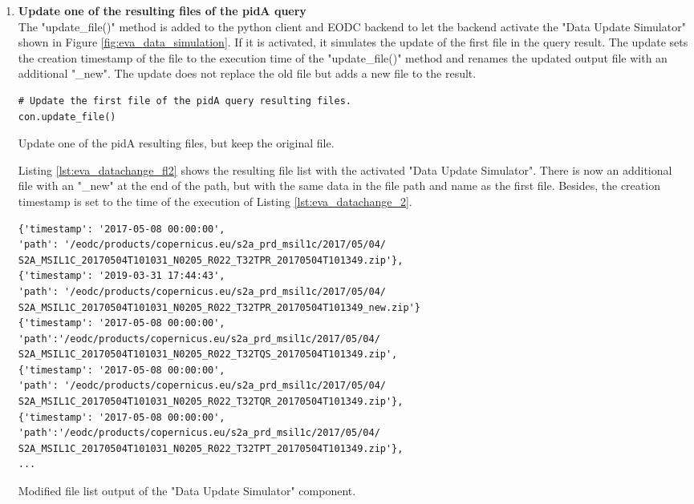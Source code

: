 \documentclass[draft,final]{vutinfth} %
\newenvironment{code}{\captionsetup{type=listing}}{}
\begin{document}
\begin{enumerate}
	\setcounter{enumi}{+1}
	\item \textbf{Update one of the resulting files of the pidA query} \\
	The "update\_file()" method is added to the python client and EODC backend to let the backend activate the "Data Update Simulator" shown in Figure \ref{fig:eva_data_simulation}. If it is activated, it simulates the update of the first file in the query result. The update sets the creation timestamp of the file to the execution time of the "update\_file()" method and renames the updated output file with an additional "\_new". The update does not replace the old file but adds a new file to the result.
	\begin{code}
		\begin{verbatim}
# Update the first file of the pidA query resulting files.
con.update_file()
		\end{verbatim}
		\caption{Update one of the pidA resulting files, but keep the original file.}
		\label{lst:eva_datachange_2}
	\end{code}
	
	Listing \ref{lst:eva_datachange_fl2} shows the resulting file list with the activated "Data Update Simulator". There is now an additional file with an "\_new" at the end of the path, but with the same data in the file path and name as the first file. Besides, the creation timestamp is set to the time of the execution of Listing \ref{lst:eva_datachange_2}.
	
	\begin{code}
		\begin{verbatim}
{'timestamp': '2017-05-08 00:00:00', 
'path': '/eodc/products/copernicus.eu/s2a_prd_msil1c/2017/05/04/
S2A_MSIL1C_20170504T101031_N0205_R022_T32TPR_20170504T101349.zip'}, 
{'timestamp': '2019-03-31 17:44:43', 
'path': '/eodc/products/copernicus.eu/s2a_prd_msil1c/2017/05/04/
S2A_MSIL1C_20170504T101031_N0205_R022_T32TPR_20170504T101349_new.zip'}
{'timestamp': '2017-05-08 00:00:00',
'path':'/eodc/products/copernicus.eu/s2a_prd_msil1c/2017/05/04/
S2A_MSIL1C_20170504T101031_N0205_R022_T32TQS_20170504T101349.zip', 
{'timestamp': '2017-05-08 00:00:00', 
'path': '/eodc/products/copernicus.eu/s2a_prd_msil1c/2017/05/04/
S2A_MSIL1C_20170504T101031_N0205_R022_T32TQR_20170504T101349.zip'}, 
{'timestamp': '2017-05-08 00:00:00',
'path':'/eodc/products/copernicus.eu/s2a_prd_msil1c/2017/05/04/
S2A_MSIL1C_20170504T101031_N0205_R022_T32TPT_20170504T101349.zip'},
...
		\end{verbatim}
		\caption{Modified file list output of the "Data Update Simulator" component.}
		\label{lst:eva_datachange_fl2}
	\end{code}
	

\end{enumerate}
\end{document}
